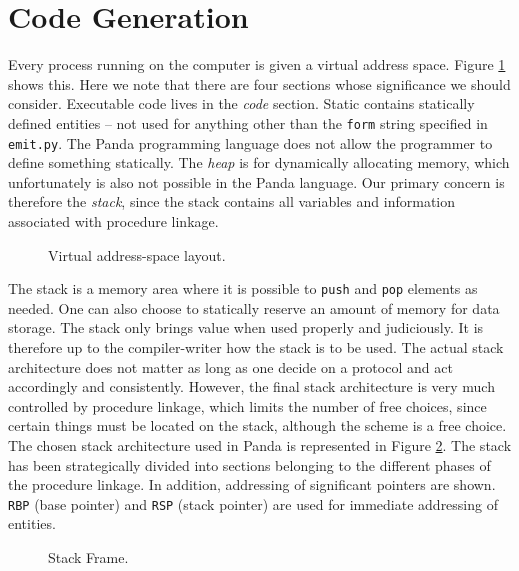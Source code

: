 \newpage

\section{Code Generation} \label{sec:code-gen}
Every process running on the computer is given a virtual address space. Figure \ref{fig:address_space} shows this. Here we note that there are four sections whose significance we should consider. Executable code lives in the \textit{code} section. Static contains statically defined entities -- not used for anything other than the \texttt{form} string specified in \texttt{emit.py}. The Panda programming language does not allow the programmer to define something statically. The \textit{heap} is for dynamically allocating memory, which unfortunately is also not possible in the Panda language. Our primary concern is therefore the \textit{stack}, since the stack contains all variables and information associated with procedure linkage.  

\begin{figure}[H]
    \centering
    
    \caption{Virtual address-space layout.} 
    \label{fig:address_space}
\end{figure}

The stack is a memory area where it is possible to \texttt{push} and \texttt{pop} elements as needed. One can also choose to statically reserve an amount of memory for data storage. The stack only brings value when used properly and judiciously. It is therefore up to the compiler-writer how the stack is to be used. The actual stack architecture does not matter as long as one decide on a protocol and act accordingly and consistently. However, the final stack architecture is very much controlled by procedure linkage, which limits the number of free choices, since certain things must be located on the stack, although the scheme is a free choice. The chosen stack architecture used in Panda is represented in Figure \ref{fig:stack}. The stack has been strategically divided into sections belonging to the different phases of the procedure linkage. In addition, addressing of significant pointers are shown. \texttt{RBP} (base pointer) and \texttt{RSP} (stack pointer) are used for immediate addressing of entities.

\begin{figure}[H]
    \centering
    
    \caption{Stack Frame.} 
    \label{fig:stack}
\end{figure}

